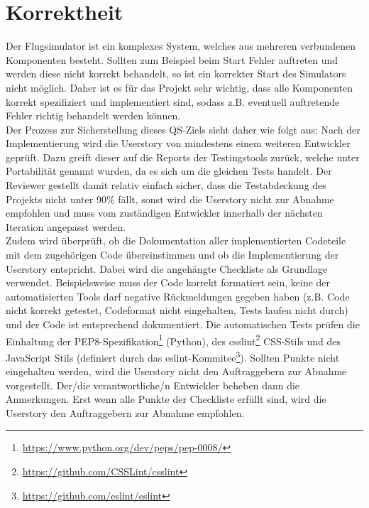 \documentclass[accentcolor=tud9c,12pt,paper=a4]{tudreport}
\begin{document}
		\section{Korrektheit}
		Der Flugsimulator ist ein komplexes System, welches aus mehreren verbundenen Komponenten besteht.
		Sollten zum Beispiel beim Start Fehler auftreten und werden diese nicht korrekt behandelt, so
		ist ein korrekter Start des Simulators nicht möglich. Daher ist es für das Projekt
		sehr wichtig, dass alle Komponenten korrekt spezifiziert und implementiert sind,
		sodass z.B. eventuell auftretende Fehler richtig behandelt werden können.
		\\[5pt]
		Der Prozess zur Sicherstellung dieses QS-Ziels sieht daher wie folgt aus:
		Nach der Implementierung wird die Userstory von mindestens einem weiteren
		Entwickler geprüft. Dazu greift dieser auf die Reports der Testingstools zurück,
		welche unter Portabilität genannt wurden, da es sich um die gleichen Tests handelt.
		Der Reviewer gestellt damit relativ einfach sicher, dass die Testabdeckung des Projekts
		nicht unter 90\% fällt, sonst wird die Userstory nicht zur Abnahme empfohlen und
		muss vom zuständigen Entwickler innerhalb der nächsten Iteration angepasst werden.
		\\[5pt]
		Zudem wird überprüft, ob die Dokumentation aller implementierten
		Codeteile mit dem zugehörigen Code übereinstimmen und ob die Implementierung der
		Userstory entspricht. Dabei wird die angehängte Checkliste als Grundlage verwendet.
		Beispielsweise muss der Code korrekt formatiert sein, keine der automatisierten Tools
		darf negative Rückmeldungen gegeben haben (z.B. Code nicht korrekt getestet, Codeformat
		nicht eingehalten, Tests laufen nicht durch) und der Code ist entsprechend dokumentiert.
		Die automatischen Tests prüfen die Einhaltung der PEP8-Spezifikation\footnote{\url{https://www.python.org/dev/peps/pep-0008/}}
		(Python), des csslint\footnote{\url{https://github.com/CSSLint/csslint}} CSS-Stils und
		des JavaScript Stils (definiert durch das eslint-Kommitee\footnote{\url{https://github.com/eslint/eslint}}).
		Sollten Punkte nicht eingehalten werden, wird die Userstory nicht den Auftraggebern zur
		Abnahme vorgestellt. Der/die verantwortliche/n Entwickler beheben dann die Anmerkungen.
		Erst wenn alle Punkte der Checkliste erfüllt sind, wird die Userstory den Auftraggebern
		zur Abnahme empfohlen.
		\newpage		
\end{document}
